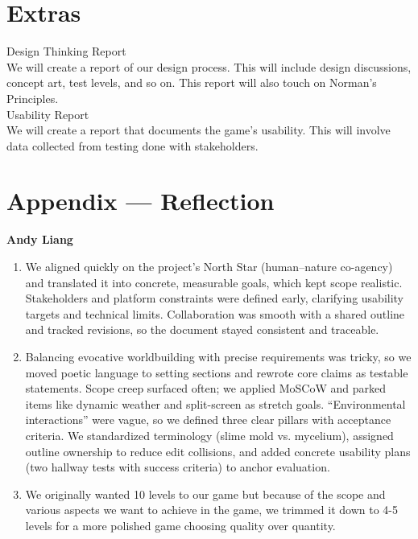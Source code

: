 \documentclass{article}
\begin{document}
\section{Extras}

Design Thinking Report\\

We will create a report of our design process. This will include design discussions, concept art, test levels, and so on. This report will also touch on Norman’s Principles.\\

Usability Report\\

We will create a report that documents the game’s usability. This will involve data collected from testing done with stakeholders.\\


\newpage{}

\section*{Appendix --- Reflection}

\textbf{Andy Liang}
\begin{enumerate}
\item{We aligned quickly on the project’s North Star (human–nature co-agency) and translated it into concrete, measurable goals, which kept scope realistic. Stakeholders and platform constraints were defined early, clarifying usability targets and technical limits. Collaboration was smooth with a shared outline and tracked revisions, so the document stayed consistent and traceable.}
\item{Balancing evocative worldbuilding with precise requirements was tricky, so we moved poetic language to setting sections and rewrote core claims as testable statements. Scope creep surfaced often; we applied MoSCoW and parked items like dynamic weather and split-screen as stretch goals. “Environmental interactions” were vague, so we defined three clear pillars with acceptance criteria. We standardized terminology (slime mold vs. mycelium), assigned outline ownership to reduce edit collisions, and added concrete usability plans (two hallway tests with success criteria) to anchor evaluation.}
\item{We originally wanted 10 levels to our game but because of the scope and various aspects we want to achieve in the game, we trimmed it down to 4-5 levels for a more polished game choosing quality over quantity. }
\end{enumerate}
\end{document}

